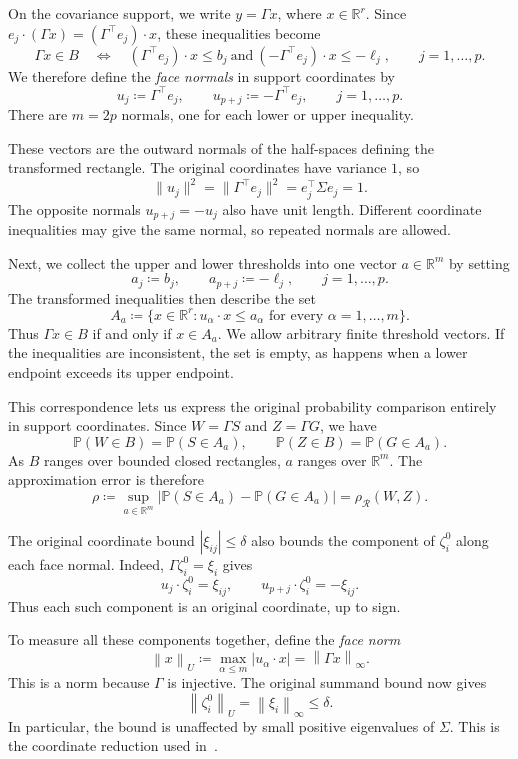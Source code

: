\documentclass[11pt,letterpaper]{article}
\theoremstyle{remark}
\newcommand{\Pp}{\mathbb P}
\newcommand{\R}{\mathbb R}
\newcommand{\norm}[1]{\left\lVert#1\right\rVert}
\newcommand{\rh}{\rho_{\mathcal R}}
\begin{document}
On the covariance support, we write \(y=\Gamma x\), where
\(x\in\R^r\). Since
\(e_j\cdot(\Gamma x)=(\Gamma^\top e_j)\cdot x\), these inequalities
become
\[
 \Gamma x\in B\quad\Longleftrightarrow\quad
 (\Gamma^\top e_j)\cdot x\le b_j\ \text{and}\
 (-\Gamma^\top e_j)\cdot x\le-\ell_j,
 \qquad j=1,\ldots,p.
\]
We therefore define the \emph{face normals} in support coordinates by
\[
 u_j\coloneqq\Gamma^\top e_j,\qquad
 u_{p+j}\coloneqq-\Gamma^\top e_j,
 \qquad j=1,\ldots,p.
\]
There are \(m=2p\) normals, one for each lower or upper inequality.

These vectors are the outward normals of the half-spaces defining
the transformed rectangle. The original coordinates have variance
\(1\), so
\[
 \|u_j\|^2=\|\Gamma^\top e_j\|^2=e_j^\top\Sigma e_j=1.
\]
The opposite normals \(u_{p+j}=-u_j\) also have unit length.
Different coordinate inequalities may give the same normal, so
repeated normals are allowed.

Next, we collect the upper and lower thresholds into one vector
\(a\in\R^m\) by setting
\[
 a_j\coloneqq b_j,\qquad a_{p+j}\coloneqq-\ell_j,
 \qquad j=1,\ldots,p.
\]
The transformed inequalities then describe the set
\[
 A_a\coloneqq\{x\in\R^r:u_\alpha\cdot x\le a_\alpha
                   \text{ for every }\alpha=1,\ldots,m\}.
\]
Thus \(\Gamma x\in B\) if and only if \(x\in A_a\). We allow
arbitrary finite threshold vectors. If the inequalities are
inconsistent, the set is empty, as happens when a lower endpoint
exceeds its upper endpoint.

This correspondence lets us express the original probability
comparison entirely in support coordinates. Since \(W=\Gamma S\)
and \(Z=\Gamma G\), we have
\[
 \Pp(W\in B)=\Pp(S\in A_a),\qquad
 \Pp(Z\in B)=\Pp(G\in A_a).
\]
As \(B\) ranges over bounded closed rectangles, \(a\) ranges over
\(\R^m\). The approximation error is therefore
\[
 \rho\coloneqq\sup_{a\in\R^m}
 |\Pp(S\in A_a)-\Pp(G\in A_a)|=\rh(W,Z).
\]

The original coordinate bound \(|\xi_{ij}|\le\delta\) also bounds
the component of \(\zeta_i^0\) along each face normal. Indeed,
\(\Gamma\zeta_i^0=\xi_i\) gives
\[
 u_j\cdot\zeta_i^0=\xi_{ij},\qquad
 u_{p+j}\cdot\zeta_i^0=-\xi_{ij}.
\]
Thus each such component is an original coordinate, up to sign.

To measure all these components together, define the \emph{face norm}
\[
 \norm x_U\coloneqq\max_{\alpha\le m}|u_\alpha\cdot x|
                  =\norm{\Gamma x}_\infty.
\]
This is a norm because \(\Gamma\) is injective. The original summand
bound now gives
\[
 \norm{\zeta_i^0}_U=\norm{\xi_i}_\infty\le\delta.
\]
In particular, the bound is unaffected by small positive eigenvalues
of \(\Sigma\). This is the coordinate reduction used
in~\cite[Section~2.3]{GaoZhang}.
\end{document}
